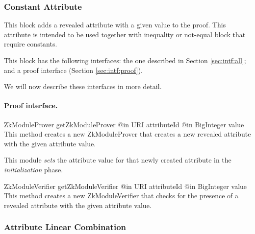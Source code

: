    \subsubsection{Constant Attribute}

    This block adds a revealed attribute with a given value to the proof. This
    attribute is intended to be used together with inequality or not-equal
    block that require constants.

    This block has the following interfaces:
    the one described in Section \ref{sec:intf:all};
    and a proof interface (Section \ref{sec:intf:proof}).

    We will now describe these interfaces in more detail.

    \paragraph{Proof interface.}
      \begin{method}
      {ZkModuleProver}
      {getZkModuleProver}
      {
        {@in URI attributeId}
        {@in BigInteger value}
      }
      This method creates a new ZkModuleProver that creates a new revealed
      attribute with the given attribute value.

      This module \emph{sets} the attribute value for that newly created attribute in the \emph{initialization} phase.
      \end{method}
      \begin{method}
      {ZkModuleVerifier}
      {getZkModuleVerifier}
      {
        {@in URI attributeId}
        {@in BigInteger value}
      }
      This method creates a new ZkModuleVerifier that checks for the presence of
      a revealed attribute with the given attribute value.
      \end{method}

    \subsubsection{Attribute Linear Combination}

